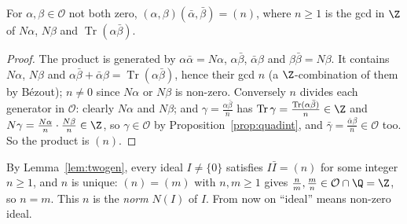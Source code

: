 \begin{lemma}\label{lem:hurwitz}
For $\alpha,\beta\in\mathcal O$ not both zero, $(\alpha,\beta)(\bar\alpha,\bar\beta)=(n)$, where $n\ge1$ is the gcd in $\Z$ of $N\alpha$, $N\beta$ and $\operatorname{Tr}(\alpha\bar\beta)$.
\end{lemma}
\begin{proof}
The product is generated by $\alpha\bar\alpha=N\alpha$, $\alpha\bar\beta$, $\bar\alpha\beta$ and $\beta\bar\beta=N\beta$. It contains $N\alpha$, $N\beta$ and $\alpha\bar\beta+\bar\alpha\beta=\operatorname{Tr}(\alpha\bar\beta)$, hence their gcd $n$ (a $\Z$-combination of them by B\'ezout); $n\ne0$ since $N\alpha$ or $N\beta$ is non-zero. Conversely $n$ divides each generator in $\mathcal O$: clearly $N\alpha$ and $N\beta$; and $\gamma=\frac{\alpha\bar\beta}n$ has $\operatorname{Tr}\gamma=\frac{\operatorname{Tr}(\alpha\bar\beta)}n\in\Z$ and $N\gamma=\frac{N\alpha}n\cdot\frac{N\beta}n\in\Z$, so $\gamma\in\mathcal O$ by Proposition~\ref{prop:quadint}, and $\bar\gamma=\frac{\bar\alpha\beta}n\in\mathcal O$ too. So the product is $(n)$.
\end{proof}

By Lemma~\ref{lem:twogen}, every ideal $I\ne\{0\}$ satisfies $I\bar I=(n)$ for some integer $n\ge1$, and $n$ is unique: $(n)=(m)$ with $n,m\ge1$ gives $\frac nm,\frac mn\in\mathcal O\cap\Q=\Z$, so $n=m$. This $n$ is the \emph{norm} $N(I)$ of $I$. From now on ``ideal'' means non-zero ideal.


